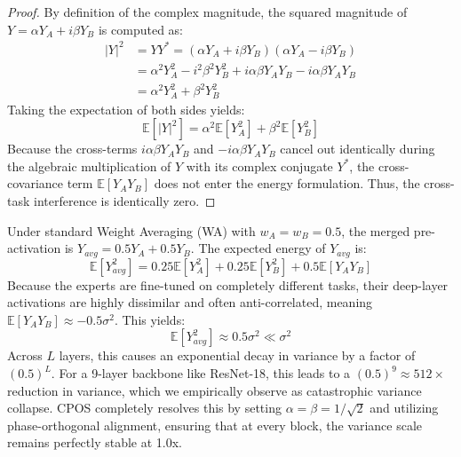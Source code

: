\documentclass{article}
\theoremstyle{plain}
\theoremstyle{definition}
\theoremstyle{remark}
\begin{document}
\begin{proof}
By definition of the complex magnitude, the squared magnitude of $Y = \alpha Y_A + i \beta Y_B$ is computed as:
\begin{align}
|Y|^2 &= Y Y^* = (\alpha Y_A + i \beta Y_B)(\alpha Y_A - i \beta Y_B) \\
&= \alpha^2 Y_A^2 - i^2 \beta^2 Y_B^2 + i \alpha \beta Y_A Y_B - i \alpha \beta Y_A Y_B \\
&= \alpha^2 Y_A^2 + \beta^2 Y_B^2
\end{align}
Taking the expectation of both sides yields:
\begin{equation}
\mathbb{E}[|Y|^2] = \alpha^2 \mathbb{E}[Y_A^2] + \beta^2 \mathbb{E}[Y_B^2]
\end{equation}
Because the cross-terms $i \alpha \beta Y_A Y_B$ and $- i \alpha \beta Y_A Y_B$ cancel out identically during the algebraic multiplication of $Y$ with its complex conjugate $Y^*$, the cross-covariance term $\mathbb{E}[Y_A Y_B]$ does not enter the energy formulation. Thus, the cross-task interference is identically zero.
\end{proof}

Under standard Weight Averaging (WA) with $w_A = w_B = 0.5$, the merged pre-activation is $Y_{avg} = 0.5 Y_A + 0.5 Y_B$. The expected energy of $Y_{avg}$ is:
\begin{equation}
\mathbb{E}[Y_{avg}^2] = 0.25 \mathbb{E}[Y_A^2] + 0.25 \mathbb{E}[Y_B^2] + 0.5 \mathbb{E}[Y_A Y_B]
\end{equation}
Because the experts are fine-tuned on completely different tasks, their deep-layer activations are highly dissimilar and often anti-correlated, meaning $\mathbb{E}[Y_A Y_B] \approx -0.5 \sigma^2$. This yields:
\begin{equation}
\mathbb{E}[Y_{avg}^2] \approx 0.5 \sigma^2 \ll \sigma^2
\end{equation}
Across $L$ layers, this causes an exponential decay in variance by a factor of $(0.5)^L$. For a 9-layer backbone like ResNet-18, this leads to a $(0.5)^9 \approx 512\times$ reduction in variance, which we empirically observe as catastrophic variance collapse. CPOS completely resolves this by setting $\alpha = \beta = 1/\sqrt{2}$ and utilizing phase-orthogonal alignment, ensuring that at every block, the variance scale remains perfectly stable at 1.0x.
\end{document}

